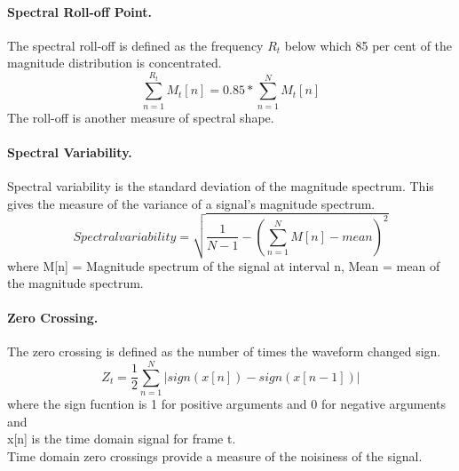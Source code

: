 \paragraph{Spectral Roll-off Point.}
The spectral roll-off is defined as the frequency $R_t$ below which 85 per cent of the magnitude distribution is concentrated.
\begin{equation}
        \sum_{n=1}^{R_t}M_t[n] = 0.85*\sum_{n=1}^{N}{M_t[n]}
\end{equation}
The roll-off is another measure of spectral shape.

\paragraph{Spectral Variability.}
  Spectral variability is the standard deviation of the magnitude spectrum. This gives the 
  measure of the variance of a signal's magnitude spectrum. 
  \begin{equation}
          Spectral variability = \sqrt{\frac{1}{N-1}-(\sum_{n=1}^{N}{M[n]-mean})^2}
  \end{equation}
  where M[n] = Magnitude spectrum of the signal at interval n,
  Mean = mean of the magnitude spectrum.

\paragraph{Zero Crossing.}
The zero crossing is defined as the number of times the waveform changed sign.
\begin{equation}
        Z_t = \frac{1}{2}\sum_{n=1}^{N}{|sign(x[n])-sign(x[n-1])|}
\end{equation}
where the sign fucntion is 1 for positive arguments and 0 for negative arguments and\\
x[n] is the time domain signal for frame t.\\
Time domain zero crossings provide a measure of the noisiness of the signal.



